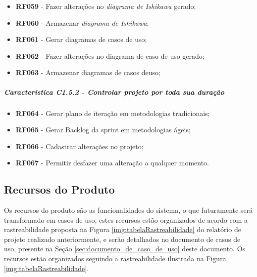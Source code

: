 \begin{enumerate}
\begin{itemize}
				\item \textbf{RF059} - Fazer alterações no \textit{diagrama de Ishikawa} gerado;
				\item \textbf{RF060} - Armazenar \textit{diagrama de Ishikawa};
				\item \textbf{RF061} - Gerar diagramas de casos de uso;
				\item \textbf{RF062} - Fazer alterações no diagrama de caso de uso gerado;
				\item \textbf{RF063} - Armazenar diagramas de casos deuso;
			\end{itemize}
		\subparagraph{Característica C1.5.2 - Controlar projeto por toda sua duração}
			\begin{itemize}
				\item \textbf{RF064} - Gerar plano de iteração em metodologias tradicionais;
				\item \textbf{RF065} - Gerar Backlog da sprint em metodologias ágeis;
				\item \textbf{RF066} - Cadastrar alterações no projeto;
				\item \textbf{RF067} - Permitir desfazer uma alteração a qualquer momento.
			\end{itemize}
	\end{enumerate}

\subsection{Recursos do Produto}
\label{subsub:recursos_produto}

Os recursos do produto são as funcionalidades do sistema, o que futuramente será transformado em casos de uso, estes recursos estão organizados de acordo com a rastreabilidade proposta na Figura \ref{img:tabelaRastreabilidade} do relatório de projeto realizado anteriormente, e serão detalhados no documento de casos de uso, presente na Seção \ref{sec:documento_de_caso_de_uso} deste documento. Os recursos estão organizados seguindo a rastreabilidade ilustrada na Figura \ref{img:tabelaRastreabilidade}.

